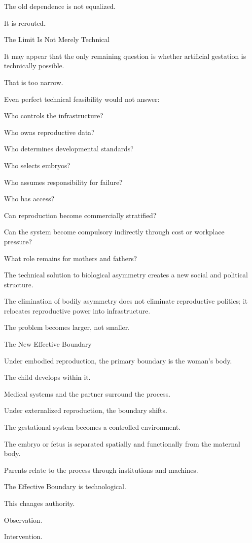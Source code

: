 The old dependence is not equalized.

It is rerouted.

The Limit Is Not Merely Technical

It may appear that the only remaining question is whether artificial gestation is technically possible.

That is too narrow.

Even perfect technical feasibility would not answer:

Who controls the infrastructure?

Who owns reproductive data?

Who determines developmental standards?

Who selects embryos?

Who assumes responsibility for failure?

Who has access?

Can reproduction become commercially stratified?

Can the system become compulsory indirectly through cost or workplace pressure?

What role remains for mothers and fathers?

The technical solution to biological asymmetry creates a new social and political structure.

The elimination of bodily asymmetry does not eliminate reproductive politics; it relocates reproductive power into infrastructure.

The problem becomes larger, not smaller.

The New Effective Boundary

Under embodied reproduction, the primary boundary is the woman’s body.

The child develops within it.

Medical systems and the partner surround the process.

Under externalized reproduction, the boundary shifts.

The gestational system becomes a controlled environment.

The embryo or fetus is separated spatially and functionally from the maternal body.

Parents relate to the process through institutions and machines.

The Effective Boundary is technological.

This changes authority.

Observation.

Intervention.


